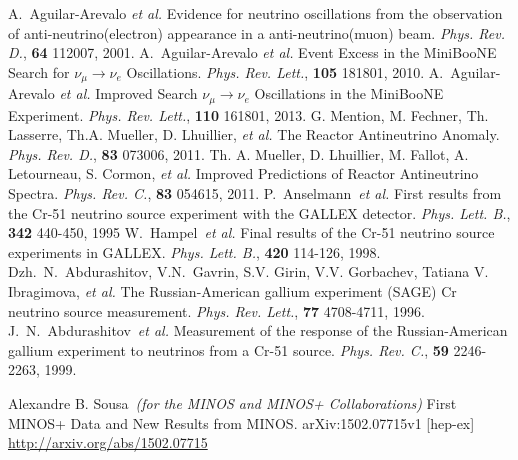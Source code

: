\documentclass[aps,prd,twocolumn,nofootinbib]{revtex4-1}
\begin{document}
\begin{thebibliography}{9}
  A.~Aguilar-Arevalo \emph{et al.} Evidence for neutrino oscillations from the observation of anti-neutrino(electron) appearance in a anti-neutrino(muon) beam. \emph{Phys. Rev. D.}, {\bf 64} 112007, 2001.
  A.~Aguilar-Arevalo \emph{et al.} Event Excess in the MiniBooNE Search for $\nu_\mu \rightarrow \nu_e$ Oscillations. \emph{Phys. Rev. Lett.}, {\bf 105} 181801, 2010.
  A.~Aguilar-Arevalo \emph{et al.} Improved Search $\nu_\mu \rightarrow \nu_e$ Oscillations in the MiniBooNE Experiment. \emph{Phys. Rev. Lett.}, {\bf 110} 161801, 2013.
  G. Mention, M. Fechner, Th. Lasserre, Th.A. Mueller, D. Lhuillier, \emph{et al.} The Reactor Antineutrino Anomaly. \emph{Phys. Rev. D.}, {\bf 83} 073006, 2011.
  Th. A. Mueller, D. Lhuillier, M. Fallot, A. Letourneau, S. Cormon, \emph{et al.} Improved Predictions of Reactor Antineutrino Spectra. \emph{Phys. Rev. C.}, {\bf 83} 054615, 2011.
  P.~Anselmann~\emph{et al.} First results from the Cr-51 neutrino source experiment with the GALLEX detector. \emph{Phys. Lett. B.}, {\bf 342} 440-450, 1995
  W.~Hampel~\emph{et al.} Final results of the Cr-51 neutrino source experiments in GALLEX. \emph{Phys. Lett. B.}, {\bf 420} 114-126, 1998.
  Dzh.~N.~Abdurashitov, V.N.~Gavrin, S.V. Girin, V.V. Gorbachev, Tatiana V. Ibragimova, \emph{et al.} The Russian-American gallium experiment (SAGE) Cr neutrino source measurement. \emph{Phys. Rev. Lett.}, {\bf 77} 4708-4711, 1996.
  J.~N.~Abdurashitov~\emph{et al.} Measurement of the response of the Russian-American gallium experiment to neutrinos from a Cr-51 source. \emph{Phys. Rev. C.}, {\bf 59} 2246-2263, 1999.

  Alexandre B. Sousa~\emph{(for the MINOS and MINOS+ Collaborations)} First MINOS+ Data and New Results from MINOS. arXiv:1502.07715v1 [hep-ex] \url{http://arxiv.org/abs/1502.07715}


\end{thebibliography}
\end{document}
